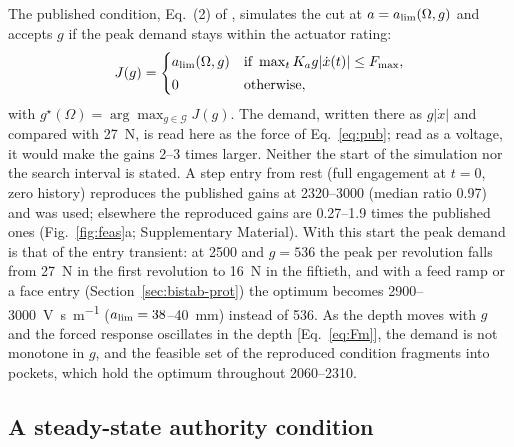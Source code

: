 The published condition, Eq.~(2) of \citet{ozsoy2026robust}, simulates the cut at $a=a_{\lim}(\Omega,g)$ and accepts $g$ if the peak demand stays within the actuator rating:
\begin{equation}\label{eq:pub}
  J(g)=\begin{cases}a_{\lim}(\Omega,g) & \text{if }\max_tK_ag\lvert\dot x(t)\rvert\le F_{\max},\\[2pt] 0 & \text{otherwise,}\end{cases}
\end{equation}
with $g^\star(\Omega)=\arg\max_{g\in\mathcal G}J(g)$. The demand, written there as $g\lvert\dot x\rvert$ and compared with \SI{27}{\newton}, is read here as the force of Eq.~\eqref{eq:pub}; read as a voltage, it would make the gains 2--3 times larger. Neither the start of the simulation nor the search interval is stated. A step entry from rest (full engagement at $t=0$, zero history) reproduces the published gains at \SIrange{2320}{3000}{\rpm} (median ratio 0.97) and was used; elsewhere the reproduced gains are 0.27--1.9 times the published ones (Fig.~\ref{fig:feas}a; Supplementary Material). With this start the peak demand is that of the entry transient: at \SI{2500}{\rpm} and $g=536$ the peak per revolution falls from \SI{27}{\newton} in the first revolution to \SI{16}{\newton} in the fiftieth, and with a feed ramp or a face entry (Section~\ref{sec:bistab-prot}) the optimum becomes 2900--\SI{3000}{\volt\second\per\metre} ($a_{\lim}=38$--\SI{40}{\milli\metre}) instead of 536. As the depth moves with $g$ and the forced response oscillates in the depth [Eq.~\eqref{eq:Fm}], the demand is not monotone in $g$, and the feasible set of the reproduced condition fragments into pockets, which hold the optimum throughout 2060--\SI{2310}{\rpm}.

\subsection{A steady-state authority condition}\label{sec:feas-new}

